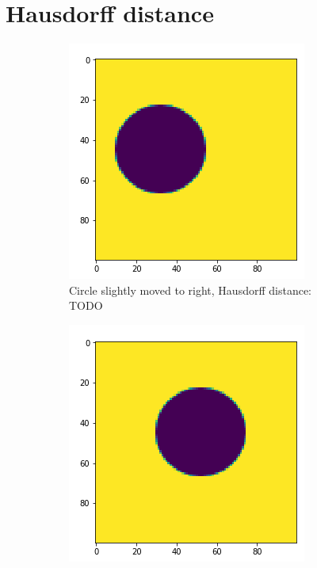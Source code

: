 \section{Hausdorff distance}

\begin{figure}[H]
    \centering
    \begin{subfigure}{.5\textwidth}
        \centering
        \includegraphics[width=\linewidth]{chapters/06_hdm/images/hdm_moved1.png}
        \caption{Circle slightly moved to right, Hausdorff distance: TODO}
    \end{subfigure}%
    \begin{subfigure}{.5\textwidth}
        \centering
        \includegraphics[width=\linewidth]{chapters/06_hdm/images/hdm_moved2.png}

\end{subfigure}
\end{figure}
